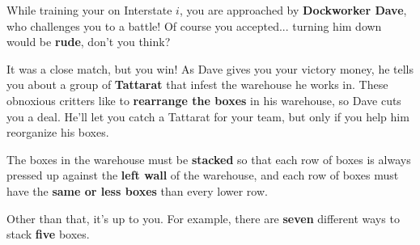 

\newcommand{\mappBoxRow}[2]{
  \fill[color=lightgray] #1 rectangle #2;
  \draw[step=1]          #1 grid #2;
}


While training your \mappMobimon{} on Interstate \(i\), you are approached
by \textbf{Dockworker Dave}, who challenges you to a \mappMobimon{} battle!
Of course you accepted... turning him down would be \textbf{rude},
don't you think?

It was a close match, but you win! As Dave gives you your victory money, he
tells you about a group of \textbf{Tattarat} \mappMobimon{} that infest the
warehouse he works in. These obnoxious critters like to
\textbf{rearrange the boxes} in his warehouse, so Dave cuts you a deal.
He'll let you catch a Tattarat for your team, but only if you help
him reorganize his boxes.

The boxes in the warehouse must be \textbf{stacked} so that
each row of boxes is always pressed up against the \textbf{left wall} of the
warehouse, and each row of boxes must have the \textbf{same or less boxes} than
every lower row.

Other than that, it's up to you. For example, there are \textbf{seven}
different ways to stack \textbf{five} boxes.

